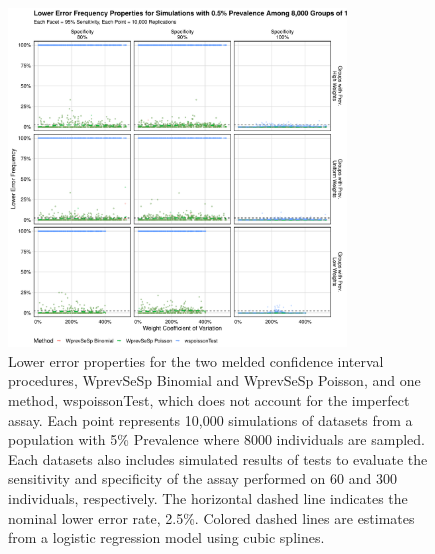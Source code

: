 \documentclass[AMA,STIX1COL]{WileyNJD-v2}
\begin{document}
\begin{figure}
\centering
\includegraphics[width=0.8\textwidth]{figures/imperfect_lower_error_frequency_8000_groups_0_005_prev.pdf}
\caption{Lower error properties for the two melded confidence interval procedures, WprevSeSp Binomial and WprevSeSp Poisson, and one method, wspoissonTest, which does not account for the imperfect assay.
Each point represents 10,000 simulations of datasets from a population with 5\% Prevalence where 8000 individuals are sampled.
Each datasets also includes simulated results of tests to evaluate the sensitivity and specificity of the assay performed on 60 and 300 individuals, respectively.
The horizontal dashed line indicates the nominal lower error rate, 2.5\%.
Colored dashed lines are estimates from a logistic regression model using cubic splines.}
\label{fig:imperfect_lower_error_frequency_8000_groups_0_005_prev}
\end{figure}
\end{document}
